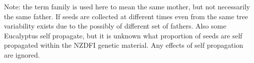 Note: the term family is used here to mean the same mother, but not necessarily
the same father. If seeds are collected at different times even from the same
tree variability exists due to the possibly of different set of fathers. Also some
Eucalyptus self propagate, but it is unknown what proportion of
seeds are self propagated within the NZDFI genetic material. Any effects of self
propagation are ignored.